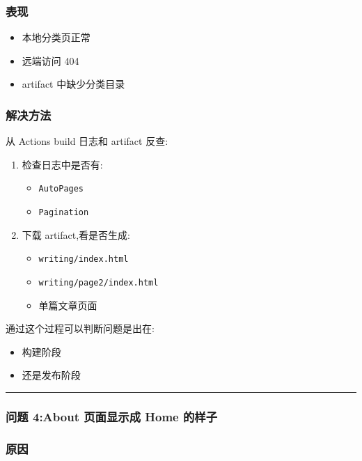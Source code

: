 \documentclass[lang=cn,scheme=chinese,color=blue,device=normal,toc=onecol,math=cm]{elegantbook}
\begin{document}
\subsubsection{表现}


\begin{itemize}
\item 本地分类页正常
\item 远端访问 404
\item artifact 中缺少分类目录
\end{itemize}


\subsubsection{解决方法}


从 Actions build 日志和 artifact 反查:\par


\begin{enumerate}
\item 检查日志中是否有: 
\begin{itemize}
\item \texttt{AutoPages}
\item \texttt{Pagination}
\end{itemize}
\item 下载 artifact,看是否生成: 
\begin{itemize}
\item \texttt{writing/\allowbreak{}index.html}
\item \texttt{writing/\allowbreak{}page2/\allowbreak{}index.html}
\item 单篇文章页面
\end{itemize}
\end{enumerate}


通过这个过程可以判断问题是出在:\par


\begin{itemize}
\item 构建阶段
\item 还是发布阶段
\end{itemize}


\medskip\hrule\medskip


\subsubsection{问题 4:About 页面显示成 Home 的样子}


\subsubsection{原因}
\end{document}

